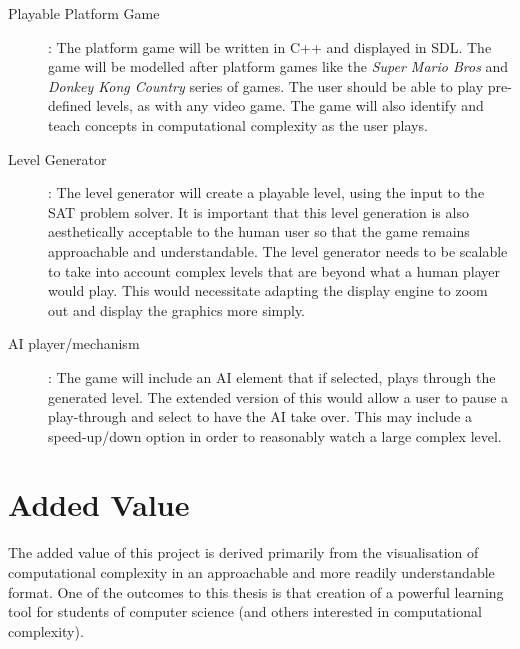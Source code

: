 \documentclass[a4paper]{article}
\begin{document}
\begin{description}
\item[Playable Platform Game]: The platform game will be written in C++ and displayed in SDL. The game will be modelled after platform games like the \textit{Super Mario Bros} and \textit{Donkey Kong Country} series of games. The user should be able to play pre-defined levels, as with any video game. The game will also identify and teach concepts in computational complexity as the user plays.
\item[Level Generator]: The level generator will create a playable level, using the input to the SAT problem solver. It is important that this level generation is also aesthetically acceptable to the human user so that the game remains approachable and understandable. The level generator needs to be scalable to take into account complex levels that are beyond what a human player would play. This would necessitate adapting the display engine to zoom out and display the graphics more simply. 
\item[AI player/mechanism]: The game will include an AI element that if selected, plays through the generated level. The extended version of this would allow a user to pause a play-through and select to have the AI take over. This may include a speed-up/down option in order to reasonably watch a large complex level. 
\end{description}

\section{Added Value}

The added value of this project is derived primarily from the visualisation of computational complexity in an approachable and more readily understandable format. One of the outcomes to this thesis is that creation of a powerful learning tool for students of computer science (and others interested in computational complexity). 
\end{document}
